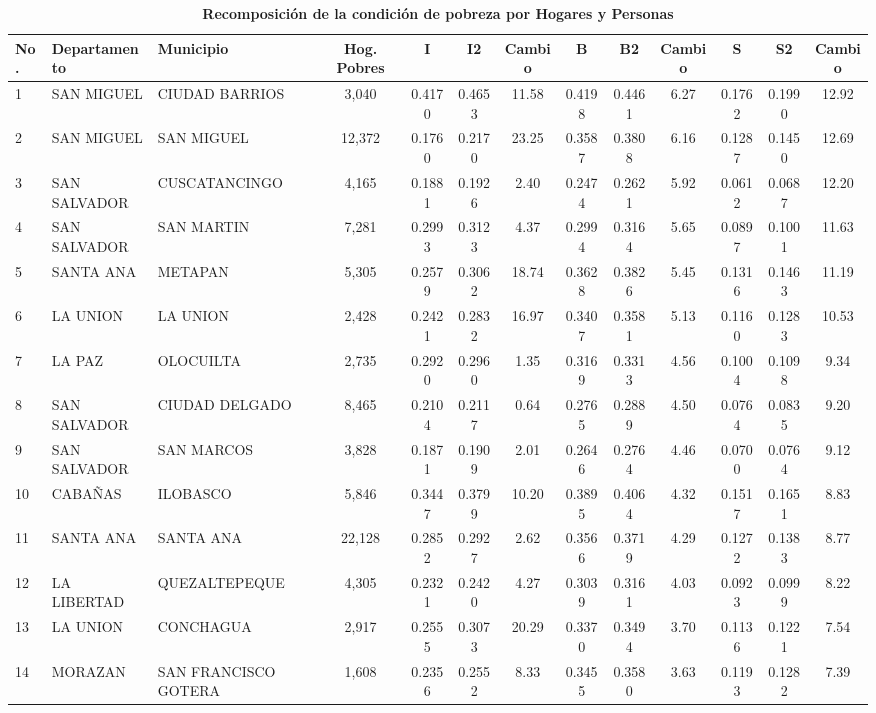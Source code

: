 \begin{table}[H]
	\centering
	\caption{\textbf{Recomposición de la condición de pobreza por Hogares y Personas }}
	\label{Tabla 7}
	\resizebox{17cm}{!} { 
		\begin{tabular}{lllcccccccccc} \toprule			
No.	&	Departamento	&	Municipio	&	Hog. Pobres	&	I	&	I2	&	Cambio	&	B	&	B2	&	Cambio	&	S	&	S2	&	Cambio	\\ \midrule
1	&	SAN MIGUEL	&	CIUDAD BARRIOS	&	3,040	&	0.4170	&	0.4653	&	11.58	&	0.4198	&	0.4461	&	6.27	&	0.1762	&	0.1990	&	12.92	\\
2	&	SAN MIGUEL	&	SAN MIGUEL	&	12,372	&	0.1760	&	0.2170	&	23.25	&	0.3587	&	0.3808	&	6.16	&	0.1287	&	0.1450	&	12.69	\\ 
3	&	SAN SALVADOR	&	CUSCATANCINGO	&	4,165	&	0.1881	&	0.1926	&	2.40	&	0.2474	&	0.2621	&	5.92	&	0.0612	&	0.0687	&	12.20	\\ 
4	&	SAN SALVADOR	&	SAN MARTIN	&	7,281	&	0.2993	&	0.3123	&	4.37	&	0.2994	&	0.3164	&	5.65	&	0.0897	&	0.1001	&	11.63	\\ 
5	&	SANTA ANA	&	METAPAN	&	5,305	&	0.2579	&	0.3062	&	18.74	&	0.3628	&	0.3826	&	5.45	&	0.1316	&	0.1463	&	11.19	\\ 
6	&	LA UNION	&	LA UNION	&	2,428	&	0.2421	&	0.2832	&	16.97	&	0.3407	&	0.3581	&	5.13	&	0.1160	&	0.1283	&	10.53	\\ 
7	&	LA PAZ	&	OLOCUILTA	&	2,735	&	0.2920	&	0.2960	&	1.35	&	0.3169	&	0.3313	&	4.56	&	0.1004	&	0.1098	&	9.34	\\ 
8	&	SAN SALVADOR	&	CIUDAD DELGADO	&	8,465	&	0.2104	&	0.2117	&	0.64	&	0.2765	&	0.2889	&	4.50	&	0.0764	&	0.0835	&	9.20	\\ 
9	&	SAN SALVADOR	&	SAN MARCOS	&	3,828	&	0.1871	&	0.1909	&	2.01	&	0.2646	&	0.2764	&	4.46	&	0.0700	&	0.0764	&	9.12	\\ 
10	&	CABAÑAS	&	ILOBASCO	&	5,846	&	0.3447	&	0.3799	&	10.20	&	0.3895	&	0.4064	&	4.32	&	0.1517	&	0.1651	&	8.83	\\ 
11	&	SANTA ANA	&	SANTA ANA	&	22,128	&	0.2852	&	0.2927	&	2.62	&	0.3566	&	0.3719	&	4.29	&	0.1272	&	0.1383	&	8.77	\\ 
12	&	LA LIBERTAD	&	QUEZALTEPEQUE	&	4,305	&	0.2321	&	0.2420	&	4.27	&	0.3039	&	0.3161	&	4.03	&	0.0923	&	0.0999	&	8.22	\\ 
13	&	LA UNION	&	CONCHAGUA	&	2,917	&	0.2555	&	0.3073	&	20.29	&	0.3370	&	0.3494	&	3.70	&	0.1136	&	0.1221	&	7.54	\\ 
14	&	MORAZAN	&	SAN FRANCISCO GOTERA	&	1,608	&	0.2356	&	0.2552	&	8.33	&	0.3455	&	0.3580	&	3.63	&	0.1193	&	0.1282	&	7.39	\\ 

\end{tabular}}
\end{table}
